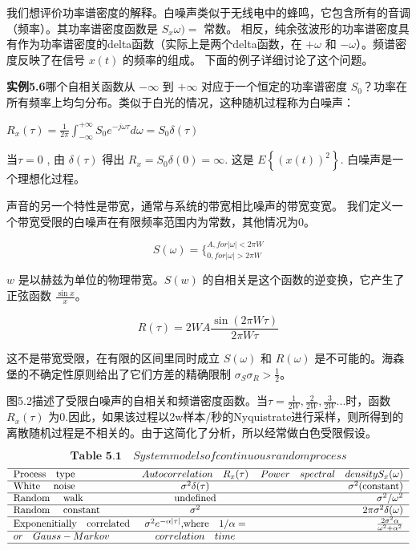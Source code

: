 	 
	     
	     我们想评价功率谱密度的解释。白噪声类似于无线电中的蜂鸣，它包含所有的音调（频率）。其功率谱密度函数是 $ S_{x}\omega) =$ 常数。 相反，纯余弦波形的功率谱密度具有作为功率谱密度的delta函数（实际上是两个delta函数，在 $ +\omega $ 和 $ -\omega $）。频谱密度反映了在信号 $ x(t) $ 的频率的组成。
	     下面的例子详细讨论了这个问题。
	     
	     \textbf{实例5.6}哪个自相关函数从 $ -\infty $ 到 $ +\infty $  对应于一个恒定的功率谱密度 $ S_{0} $？功率在所有频率上均匀分布。类似于白光的情况，这种随机过程称为白噪声：
	     
	     	$ R_{x}(\tau) =\frac{1}{2\pi}\int_{-\infty}^{+\infty}S_{0}e^{-j\omega\tau}d\omega=S_{0}\delta(\tau) $ 
	     	
	     	当$ \tau=0 $ , 由 $ \delta(\tau) $ 得出 $ R_{x}=S_{0}\delta(0)=\infty $. 这是 $ E\left\lbrace (x(t))^{2}\right\rbrace  $. 白噪声是一个理想化过程。
	     	
	     	声音的另一个特性是带宽，通常与系统的带宽相比噪声的带宽变宽。
	     	我们定义一个带宽受限的白噪声在有限频率范围内为常数，其他情况为0。
	     	
	     		\[ S(\omega) =\{ _{0,for|\omega|>2\pi W}^{A,for|\omega|<2\pi W} \]
	     	
	     	
	     	$ w $ 是以赫兹为单位的物理带宽。$ S(w) $ 的自相关是这个函数的逆变换，它产生了正弦函数 $ \frac{\sin x}{x} $。
	     	
	     		\[ R(\tau)=2WA\frac{\sin (2\pi W \tau)}{2\pi W \tau}\]
	     		
	     	这不是带宽受限，在有限的区间里同时成立 $ S(\omega) $  和 $ R(\omega) $  是不可能的。海森堡的不确定性原则给出了它们方差的精确限制 $ \sigma_{S}\sigma_{R} >\frac{1}{2} $。	
	     	
	     	图5.2描述了受限白噪声的自相关和频谱密度函数。当$\tau=\frac{1}{2W},\frac{2}{2W},\frac{3}{2W}... $时，函数  $ R_{x}(\tau) $ 为0.因此，如果该过程以2w样本/秒的Nyquistrate进行采样，则所得到的离散随机过程是不相关的。由于这简化了分析，所以经常做白色受限假设。
	     	
	     	\[ \textbf{Table 5.1} \quad System models of continuous random process \] 
	     	\[ \begin{tabular}{lcr}
	     	\hline
	     	Process\quad type & $ Autocorrelation\quad R_{x}(\tau) $ & $ Power \quad spectral \quad density S_{x}(\omega) $ \\
	     	\cline{1-3}
	     	White \quad noise &$  \sigma^{2}\delta(\tau) $  & $ \sigma^{2} $(constant)\\
	     	\cline{1-3}
	     	Random \quad walk&undefined&$ \sigma^{2}/\omega^{2} $\\
	     	\cline{1-3}
	     	Random \quad constant&$ \sigma^{2} $&$ 2\pi\sigma^{2}\delta(\omega) $\\
	     	\cline{1-3}
	     	Exponenitially\quad correlated &$ \sigma^{2}e^{-\alpha|\tau|} $,where\quad$  1/\alpha= $&$ \frac{2\sigma^{2}\alpha}{\omega^{2}+\alpha^{2}} $\\
	     	\cline{1-3}
	     	$ or\quad Gauss-Markov  $& $ correlation\quad time $& $ \quad $ \\
	     	\hline
	     	\end{tabular} \]      	
	     	
	     